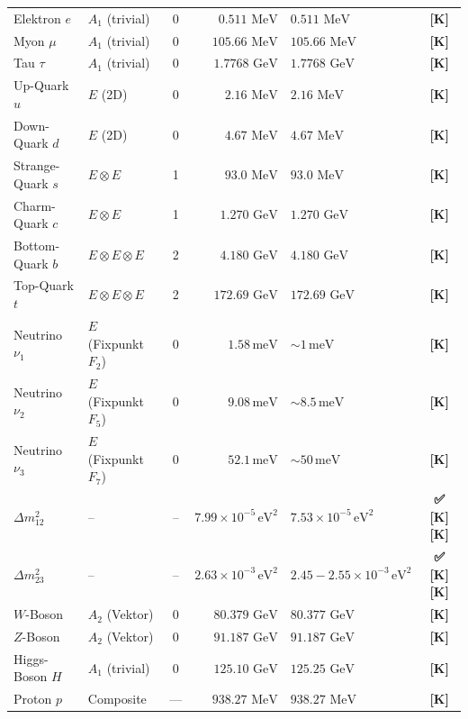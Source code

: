 \documentclass[11pt,a4paper]{article}
\newcommand{\Checkmark}{\textbf{✅ [K]}}
\begin{document}
\begin{longtable}{llcrlc}
		Elektron $e$ & $A_1$ (trivial) & 0 & $0.511\text{ MeV}$ & $0.511\text{ MeV}$ & \textbf{[K]} \\
		Myon $\mu$ & $A_1$ (trivial) & 0 & $105.66\text{ MeV}$ & $105.66\text{ MeV}$ & \textbf{[K]} \\
		Tau $\tau$ & $A_1$ (trivial) & 0 & $1.7768\text{ GeV}$ & $1.7768\text{ GeV}$ & \textbf{[K]} \\
		\midrule
		Up-Quark $u$ & $E$ (2D) & 0 & $2.16\text{ MeV}$ & $2.16\text{ MeV}$ & \textbf{[K]} \\
		Down-Quark $d$ & $E$ (2D) & 0 & $4.67\text{ MeV}$ & $4.67\text{ MeV}$ & \textbf{[K]} \\
		Strange-Quark $s$ & $E \otimes E$ & 1 & $93.0\text{ MeV}$ & $93.0\text{ MeV}$ & \textbf{[K]} \\
		Charm-Quark $c$ & $E \otimes E$ & 1 & $1.270\text{ GeV}$ & $1.270\text{ GeV}$ & \textbf{[K]} \\
		Bottom-Quark $b$ & $E \otimes E \otimes E$ & 2 & $4.180\text{ GeV}$ & $4.180\text{ GeV}$ & \textbf{[K]} \\
		Top-Quark $t$ & $E \otimes E \otimes E$ & 2 & $172.69\text{ GeV}$ & $172.69\text{ GeV}$ & \textbf{[K]} \\
		\midrule
		Neutrino $\nu_1$ & $E$ (Fixpunkt $F_2$) & 0 & $1.58\,\text{meV}$ & $\sim 1\,\text{meV}$ & \textbf{[K]} \\
		Neutrino $\nu_2$ & $E$ (Fixpunkt $F_5$) & 0 & $9.08\,\text{meV}$ & $\sim 8.5\,\text{meV}$ & \textbf{[K]} \\
		Neutrino $\nu_3$ & $E$ (Fixpunkt $F_7$) & 0 & $52.1\,\text{meV}$ & $\sim 50\,\text{meV}$ & \textbf{[K]} \\
		\midrule
		$\Delta m_{12}^2$ & -- & -- & $7.99 \times 10^{-5}\,\text{eV}^2$ & $7.53 \times 10^{-5}\,\text{eV}^2$ & \Checkmark \textbf{[K]} \\
		$\Delta m_{23}^2$ & -- & -- & $2.63 \times 10^{-3}\,\text{eV}^2$ & $2.45 - 2.55 \times 10^{-3}\,\text{eV}^2$ & \Checkmark \textbf{[K]} \\
		\midrule
		$W$-Boson & $A_2$ (Vektor) & 0 & $80.379\text{ GeV}$ & $80.377\text{ GeV}$ & \textbf{[K]} \\
		$Z$-Boson & $A_2$ (Vektor) & 0 & $91.187\text{ GeV}$ & $91.187\text{ GeV}$ & \textbf{[K]} \\
		Higgs-Boson $H$ & $A_1$ (trivial) & 0 & $125.10\text{ GeV}$ & $125.25\text{ GeV}$ & \textbf{[K]} \\
		Proton $p$ & Composite & --- & $938.27\text{ MeV}$ & $938.27\text{ MeV}$ & \textbf{[K]} \\
	\end{longtable}
	
\end{document}
